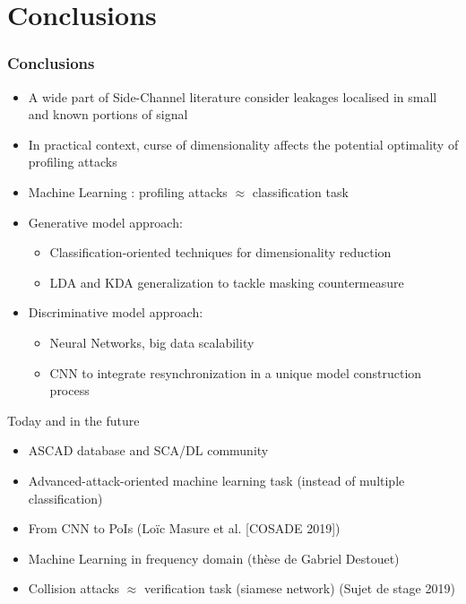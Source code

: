
\section{Conclusions}

\begin{frame}
\frametitle{Conclusions}
\vspace{-10pt}
\begin{itemize}
\item A wide part of Side-Channel literature consider leakages localised in small and known portions of signal
\item In practical context, curse of dimensionality affects the potential optimality of profiling attacks
\item Machine Learning : profiling attacks $\approx$ classification task
\item Generative model approach:
\begin{itemize}
\item Classification-oriented techniques for dimensionality reduction 
\item LDA and KDA generalization to tackle masking countermeasure
\end{itemize}
\item Discriminative model approach:
\begin{itemize}
\item Neural Networks, big data scalability
\item CNN to integrate resynchronization in a unique model construction process
\end{itemize}
\end{itemize}
\pause
\begin{block}{Today and in the future}
\begin{itemize}
\item ASCAD database and SCA/DL community
\item Advanced-attack-oriented machine learning task (instead of multiple classification)
\item From CNN to PoIs (Lo\"ic Masure et al. [COSADE 2019])
\item Machine Learning in frequency domain (thèse de Gabriel Destouet) 
\item Collision attacks $\approx$ verification task (siamese network) (Sujet de stage 2019)
\end{itemize}
\end{block}


\end{frame}

